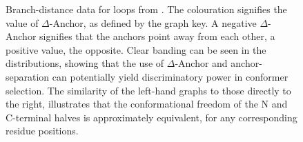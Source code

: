 \begin{figure}[hbtp]
\begin{center}
{}
\end{center}
\caption[Data for  loops from \thothloopdb]{Branch-distance data for  loops from \thothloopdb. The colouration signifies the value of $\Delta$-Anchor, as defined by the graph key. A negative $\Delta$-Anchor signifies that the anchors point away from each other, a positive value, the opposite. Clear banding can be seen in the distributions, showing that the use of $\Delta$-Anchor and anchor-separation can potentially yield discriminatory power in conformer selection. The similarity of the left-hand graphs to those directly to the right, illustrates that the conformational freedom of the N and C-terminal halves is approximately equivalent, for any corresponding residue positions.}
\label{fig:arcus:segsymmetry}
\end{figure}
